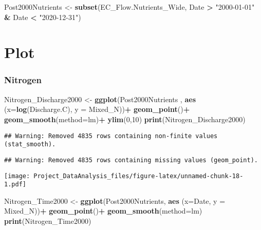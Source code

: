 \documentclass[]{article}
\newenvironment{Shaded}{\begin{snugshade}}{\end{snugshade}}
\newcommand{\DataTypeTok}[1]{\textcolor[rgb]{0.13,0.29,0.53}{#1}}
\newcommand{\DecValTok}[1]{\textcolor[rgb]{0.00,0.00,0.81}{#1}}
\newcommand{\KeywordTok}[1]{\textcolor[rgb]{0.13,0.29,0.53}{\textbf{#1}}}
\newcommand{\NormalTok}[1]{#1}
\newcommand{\OperatorTok}[1]{\textcolor[rgb]{0.81,0.36,0.00}{\textbf{#1}}}
\newcommand{\StringTok}[1]{\textcolor[rgb]{0.31,0.60,0.02}{#1}}
\begin{document}
\begin{Shaded}
\begin{Highlighting}[]
\NormalTok{Post2000Nutrients <-}\StringTok{ }\KeywordTok{subset}\NormalTok{(EC_Flow.Nutrients_Wide, Date }\OperatorTok{>}\StringTok{ "2000-01-01"} \OperatorTok{&}\StringTok{ }\NormalTok{Date }\OperatorTok{<}\StringTok{ "2020-12-31"}\NormalTok{)}
\end{Highlighting}
\end{Shaded}

\hypertarget{plot}{%
\section{Plot}\label{plot}}

\hypertarget{nitrogen-3}{%
\subsubsection{Nitrogen}\label{nitrogen-3}}

\begin{Shaded}
\begin{Highlighting}[]
\NormalTok{Nitrogen_Discharge2000 <-}\StringTok{ }
\StringTok{  }\KeywordTok{ggplot}\NormalTok{(Post2000Nutrients , }\KeywordTok{aes}\NormalTok{ (}\DataTypeTok{x=}\KeywordTok{log}\NormalTok{(Discharge.C), }\DataTypeTok{y =}\NormalTok{ Mixed_N))}\OperatorTok{+}
\StringTok{  }\KeywordTok{geom_point}\NormalTok{()}\OperatorTok{+}
\StringTok{  }\KeywordTok{geom_smooth}\NormalTok{(}\DataTypeTok{method=}\NormalTok{lm)}\OperatorTok{+}
\StringTok{  }\KeywordTok{ylim}\NormalTok{(}\DecValTok{0}\NormalTok{,}\DecValTok{10}\NormalTok{)}
\KeywordTok{print}\NormalTok{(Nitrogen_Discharge2000)}
\end{Highlighting}
\end{Shaded}

\begin{verbatim}
## Warning: Removed 4835 rows containing non-finite values (stat_smooth).
\end{verbatim}

\begin{verbatim}
## Warning: Removed 4835 rows containing missing values (geom_point).
\end{verbatim}

\texttt{[image: Project\_DataAnalysis\_files/figure-latex/unnamed-chunk-18-1.pdf]}

\begin{Shaded}
\begin{Highlighting}[]
\NormalTok{Nitrogen_Time2000 <-}\StringTok{ }
\StringTok{  }\KeywordTok{ggplot}\NormalTok{(Post2000Nutrients, }\KeywordTok{aes}\NormalTok{ (}\DataTypeTok{x=}\NormalTok{Date, }\DataTypeTok{y =}\NormalTok{ Mixed_N))}\OperatorTok{+}
\StringTok{  }\KeywordTok{geom_point}\NormalTok{()}\OperatorTok{+}
\StringTok{  }\KeywordTok{geom_smooth}\NormalTok{(}\DataTypeTok{method=}\NormalTok{lm)}
\KeywordTok{print}\NormalTok{(Nitrogen_Time2000)}
\end{Highlighting}
\end{Shaded}
\end{document}
